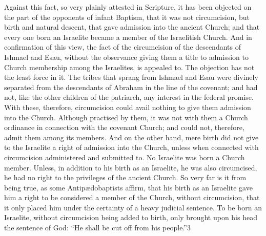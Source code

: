 \documentclass[]{book}
\begin{document}
Against this fact, so very plainly attested in Scripture, it has been objected on the part of the opponents of infant Baptism, that it was not circumcision, but birth and natural descent, that gave admission into the ancient Church; and that every one born an Israelite became a member of the Israelitish Church. And in confirmation of this view, the fact of the circumcision of the descendants of Ishmael and Esau, without the observance giving them a title to admission to Church membership among the Israelites, is appealed to. The objection has not the least force in it. The tribes that sprang from Ishmael and Esau were divinely separated from the descendants of Abraham in the line of the covenant; and had not, like the other children of the patriarch, any interest in the federal promise. With these, therefore, circumcision could avail nothing to give them admission into the Church. Although practised by them, it was not with them a Church ordinance in connection with the covenant Church; and could not, therefore, admit them among its members. And on the other hand, mere birth did not give to the Israelite a right of admission into the Church, unless when connected with circumcision administered and submitted to. No Israelite was born a Church member. Unless, in addition to his birth as an Israelite, he was also circumcised, he had no right to the privileges of the ancient Church. So very far is it from being true, as some Antipædobaptists affirm, that his birth as an Israelite gave him a right to be considered a member of the Church, without circumcision, that it only placed him under the certainty of a heavy judicial sentence. To be born an Israelite, without circumcision being added to birth, only brought upon his head the sentence of God: ``He shall be cut off from his people.''3
\end{document}
